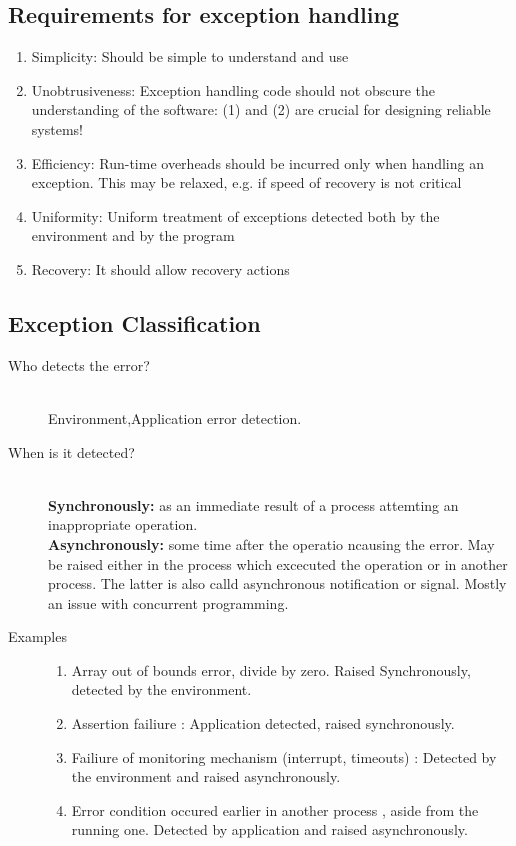 \documentclass[a4paper,10pt]{scrreprt}
\begin{document}
\subsection{Requirements for exception handling}
\begin{enumerate}
\item Simplicity: Should be simple to understand and use
\item  Unobtrusiveness: Exception handling code should not obscure the
understanding of the software: (1) and (2) are crucial for designing
reliable systems!
\item  Efficiency: Run-time overheads should be incurred only when handling
an exception. This may be relaxed, e.g. if speed of recovery is not
critical
\item  Uniformity: Uniform treatment of exceptions detected both by the
environment and by the program
\item  Recovery: It should allow recovery actions 
\end{enumerate}

\subsection{Exception Classification}
\begin{description}
 \item [Who detects the error?] \hfill \\
 Environment,Application error detection.
 \item[When is it detected?] \hfill \\
 \textbf{Synchronously:} as an immediate result of a process attemting an inappropriate operation.\\
 \textbf{Asynchronously:} some time after the operatio ncausing the error. May be raised either in the process which 
excecuted the operation or in another process. The latter is also calld asynchronous notification or signal. Mostly an 
issue with concurrent programming.
\item[Examples] \begin{enumerate}
                 \item Array out of bounds error, divide by zero. Raised Synchronously, detected by the environment.
                 \item Assertion failiure : Application detected, raised synchronously.
                 \item Failiure of monitoring mechanism (interrupt, timeouts) : Detected by the environment and raised 
asynchronously.
\item Error condition occured earlier  in another process , aside from the running one. Detected by application and 
raised asynchronously.
                \end{enumerate}

\end{description}
\end{document}
